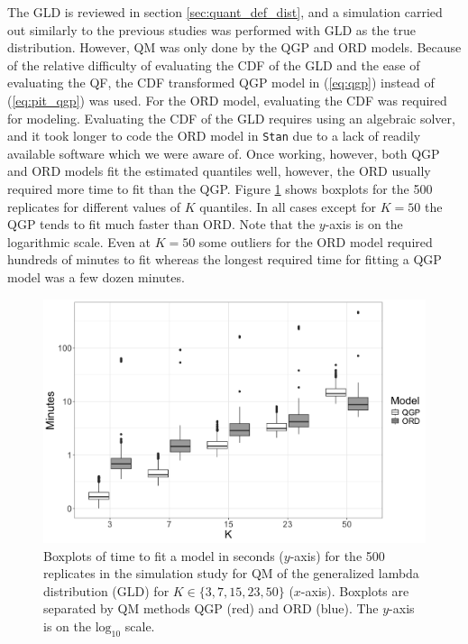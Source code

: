 The GLD is reviewed in section \ref{sec:quant_def_dist}, and a simulation 
carried out similarly to the previous studies was performed with GLD as the 
true distribution. However, QM was only done by the QGP and ORD models. 
Because of the relative difficulty of evaluating the CDF of the GLD and the 
ease of evaluating the QF, the CDF transformed QGP model in (\ref{eq:qgp}) 
instead of (\ref{eq:pit_qgp}) was used. For the ORD model, evaluating the CDF 
was required for modeling. Evaluating the CDF of the GLD requires using an 
algebraic solver, and it took longer to code the ORD model in \texttt{Stan} 
due to a lack of readily available software which we were aware of. 
Once working, however, both QGP and ORD models fit the estimated quantiles 
well, however, the ORD usually required more time to fit than the QGP. 
Figure \ref{fig:tuk_time} shows boxplots for the 500 replicates for different 
values of $K$ quantiles. In all cases except for $K=50$ the QGP tends to fit 
much faster than ORD. Note that the $y$-axis is on the logarithmic scale. Even 
at $K=50$ some outliers for the ORD model required hundreds of minutes to fit 
whereas the longest required time for fitting a QGP model was a few dozen
minutes.


\begin{figure}[hbt!]
    \centering
    \includegraphics[scale=.22]{Images/tukey_time_log10.png}
    \caption{Boxplots of time to fit a model in seconds ($y$-axis) for the 500 
    replicates in the simulation study for QM of the generalized lambda 
    distribution (GLD) for $K \in \{3, 7, 15, 23, 50\}$ ($x$-axis). Boxplots 
    are separated by QM methods QGP (red) and ORD (blue). The $y$-axis is on 
    the $\text{log}_{10}$ scale.}
    \label{fig:tuk_time}
\end{figure}

